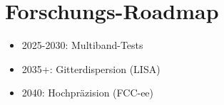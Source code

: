 \section{Forschungs-Roadmap}
\begin{itemize}
    \item 2025-2030: Multiband-Tests
    \item 2035+: Gitterdispersion (LISA)
    \item 2040: Hochpräzision (FCC-ee)
\end{itemize}